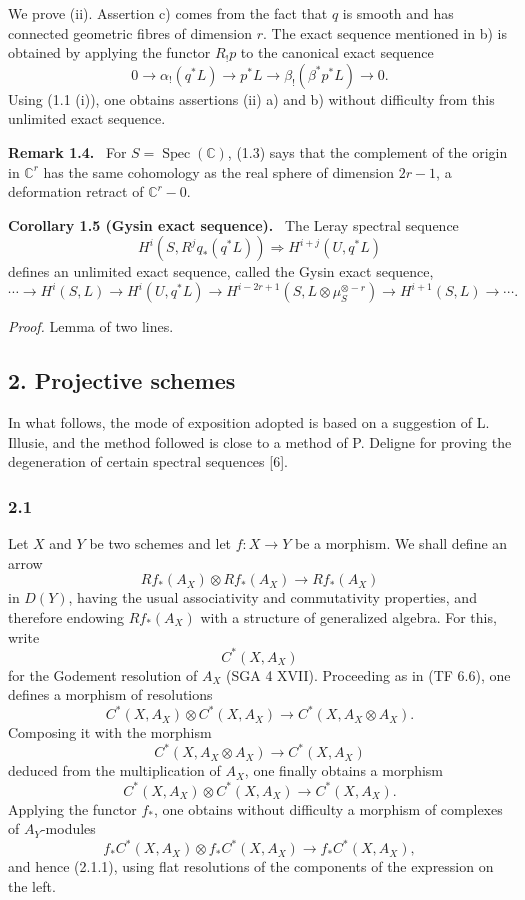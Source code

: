 \documentclass[11pt]{article}
\newenvironment{statement}[1]{\par\medskip\noindent\textbf{#1.}\ }{\par\medskip}
\begin{document}
We prove (ii). Assertion c) comes from the fact that $q$ is smooth and has connected geometric fibres of dimension $r$. The exact sequence mentioned in b) is obtained by applying the functor $R_!p$ to the canonical exact sequence
\[
0\longrightarrow \alpha_!(q^*L)\longrightarrow p^*L\longrightarrow \beta_!(\beta^*p^*L)\longrightarrow 0.
\]
Using (1.1 (i)), one obtains assertions (ii) a) and b) without difficulty from this unlimited exact sequence.

\begin{statement}{Remark 1.4}
For $S=\operatorname{Spec}(\mathbb C)$, (1.3) says that the complement of the origin in $\mathbb C^r$ has the same cohomology as the real sphere of dimension $2r-1$, a deformation retract of $\mathbb C^r-0$.
\end{statement}

\begin{statement}{Corollary 1.5 (Gysin exact sequence)}
The Leray spectral sequence
\[
H^i(S,R^j q_*(q^*L))\Rightarrow H^{i+j}(U,q^*L)
\]
defines an unlimited exact sequence, called the Gysin exact sequence,
\[
\cdots\longrightarrow H^i(S,L)\longrightarrow H^i(U,q^*L)\longrightarrow
H^{i-2r+1}(S,L\otimes\mu_S^{\otimes -r})\longrightarrow H^{i+1}(S,L)\longrightarrow\cdots.
\]
\end{statement}

\emph{Proof.} Lemma of two lines.

\subsection*{2. Projective schemes}

In what follows, the mode of exposition adopted is based on a suggestion of L. Illusie, and the method followed is close to a method of P. Deligne for proving the degeneration of certain spectral sequences [6].

\subsubsection*{2.1}
Let $X$ and $Y$ be two schemes and let $f:X\to Y$ be a morphism. We shall define an arrow
\[
Rf_*(A_X)\otimes Rf_*(A_X)\longrightarrow Rf_*(A_X)
\tag{2.1.1}
\]
in $D(Y)$, having the usual associativity and commutativity properties, and therefore endowing $Rf_*(A_X)$ with a structure of generalized algebra. For this, write
\[
C^*(X,A_X)
\]
for the Godement resolution of $A_X$ (SGA 4 XVII). Proceeding as in (TF 6.6), one defines a morphism of resolutions
\[
C^*(X,A_X)\otimes C^*(X,A_X)\longrightarrow C^*(X,A_X\otimes A_X).
\]
Composing it with the morphism
\[
C^*(X,A_X\otimes A_X)\longrightarrow C^*(X,A_X)
\]
deduced from the multiplication of $A_X$, one finally obtains a morphism
\[
C^*(X,A_X)\otimes C^*(X,A_X)\longrightarrow C^*(X,A_X).
\tag{2.1.2}
\]
Applying the functor $f_*$, one obtains without difficulty a morphism of complexes of $A_Y$-modules
\[
f_*C^*(X,A_X)\otimes f_*C^*(X,A_X)\longrightarrow f_*C^*(X,A_X),
\]
and hence (2.1.1), using flat resolutions of the components of the expression on the left.
\end{document}

